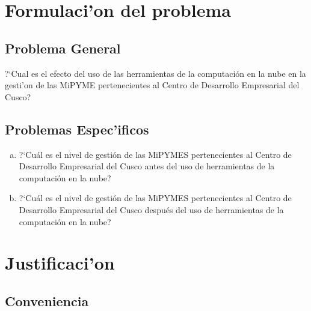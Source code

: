 \section{Formulaci'on del problema}
\subsection{Problema General}
?`Cual es el efecto del uso de las herramientas de la computaci\'on en la nube
en la gesti'on de las MiPYME pertenecientes al Centro de Desarrollo Empresarial
del Cusco?
\subsection{Problemas Espec'ificos}
\begin{enumerate}[a.]
\item ?`Cu\'al es el nivel de gesti\'on de las MiPYMES pertenecientes al Centro
de Desarrollo Empresarial del Cusco antes del uso de herramientas de la computaci\'on
en la nube?
\item ?`Cu\'al es el nivel de gesti\'on de las MiPYMES pertenecientes al Centro
de Desarrollo Empresarial del Cusco despu\'es del uso de herramientas de la computaci\'on
en la nube?
\end{enumerate}

%
\section{Justificaci'on}
\subsection{Conveniencia}

